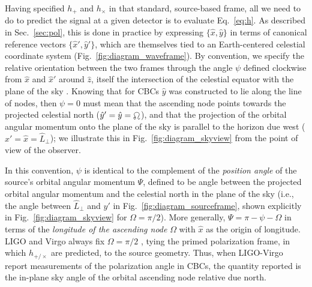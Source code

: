 \documentclass[aps,prd,twocolumn,superscriptaddress,preprintnumbers,floatfix,nofootinbib]{revtex4-2}
\newcommand*{\eq}[1]{Eq.~\eqref{eq:#1}}
\begin{document}
Having specified $h_+$ and $h_\times$ in that standard, source-based frame, all we need to do to predict the signal at a given detector is to evaluate \eq{h}.
As described in Sec.~\ref{sec:pol}, this is done in practice by expressing $\{\hat{x}, \hat{y}\}$ in terms of canonical reference vectors $\{\hat{x}',\hat{y}'\}$, which are themselves tied to an Earth-centered celestial coordinate system (Fig.~\ref{fig:diagram_waveframe}).
By convention, we specify the relative orientation between the two frames through the angle $\psi$ defined clockwise from $\hat{x}$ and $\hat{x}'$ around $\hat{z}$, itself the intersection of the celestial equator with the plane of the sky \cite{LALSuite:wave}.
Knowing that for CBCs $\hat{y}$ was constructed to lie along the line of nodes, then $\psi = 0$ must mean that the ascending node points towards the projected celestial north ($\hat{y}'=\hat{y}=\ascnode$), and that the projection of the orbital angular momentum onto the plane of the sky is parallel to the horizon due west ($\hat{x}'=\hat{x}=\hat{L}_\perp$); we illustrate this in Fig.~\ref{fig:diagram_skyview} from the point of view of the observer.

In this convention, $\psi$ is identical to the complement of the \emph{position angle} of the source's orbital angular momentum $\Psi$, defined to be angle between the projected orbital angular momentum and the celestial north in the plane of the sky (i.e., the angle between $\hat{L}_\perp$ and $\hat{y}'$ in Fig.~\ref{fig:diagram_sourceframe}, shown explicitly in Fig.~\ref{fig:diagram_skyview} for $\Omega=\pi/2$).
More generally, $\Psi = \pi - \psi - \Omega$ in terms of the \emph{longitude of the ascending node} $\Omega$ with $\hat{x}$ as the origin of longitude.
LIGO and Virgo always fix $\Omega = \pi/2$ \cite{LALSuite:source}, tying the primed polarization frame, in which $h_{+/\times}$ are predicted, to the source geometry.
Thus, when LIGO-Virgo report measurements of the polarization angle in CBCs, the quantity reported is the in-plane sky angle of the orbital ascending node relative due north.
\end{document}
